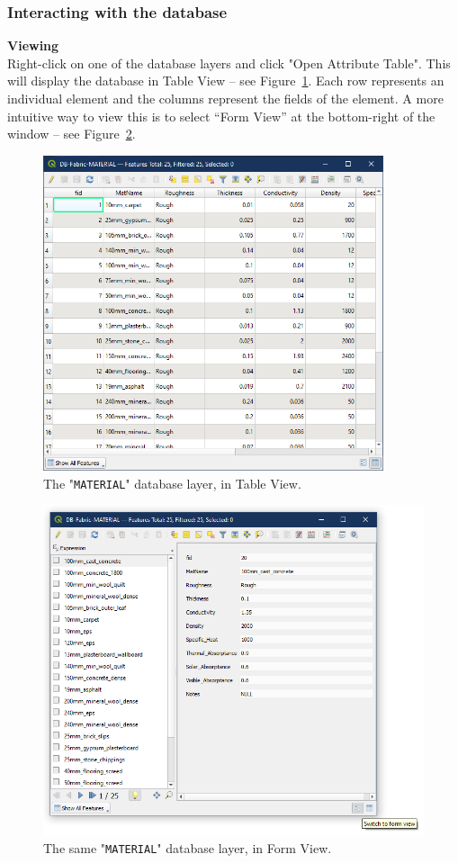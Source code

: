 \documentclass{article}
\begin{document}
\subsubsection{Interacting with the database}
\textbf{Viewing} \\
Right-click on one of the database layers and click "Open Attribute Table". This will display the database in Table View -- see Figure~\ref{fig:db1}. Each row represents an individual element and the columns represent the fields of the element. A more intuitive way to view this is to select ``Form View'' at the bottom-right of the window -- see Figure~\ref{fig:db2}. \\

\begin{figure}[h!]
    \centering
    \includegraphics[width=10cm]{Figures/databaselayer1.png}
    \caption{The "\texttt{MATERIAL}" database layer, in Table View.}
    \label{fig:db1}
\end{figure}
\begin{figure}[h!]
    \centering
    \includegraphics[width=12cm]{Figures/databaselayer2.png}
    \caption{The same "\texttt{MATERIAL}" database layer, in Form View.}
    \label{fig:db2}
\end{figure}
\end{document}
